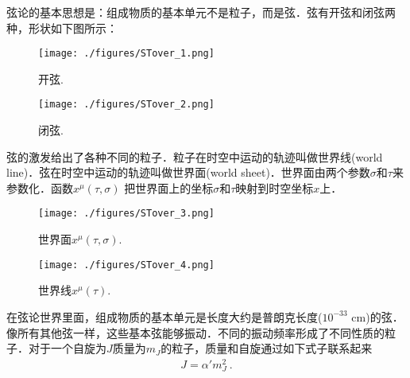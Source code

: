 弦论的基本思想是：组成物质的基本单元不是粒子，而是弦．弦有开弦和闭弦两种，形状如下图所示：
\begin{figure}[ht]
\centering
\texttt{[image: ./figures/STover\_1.png]}
\caption{开弦.} \label{STover_fig1}
\end{figure}
\begin{figure}[ht]
\centering
\texttt{[image: ./figures/STover\_2.png]}
\caption{闭弦.} \label{STover_fig2}
\end{figure}
弦的激发给出了各种不同的粒子．粒子在时空中运动的轨迹叫做世界线(world line)．弦在时空中运动的轨迹叫做世界面(world sheet)．世界面由两个参数$\sigma$和$\tau$来参数化．函数$x^\mu(\tau,\sigma)$ 把世界面上的坐标$\sigma$和$\tau$映射到时空坐标$x$上．

\begin{figure}[ht]
\centering
\texttt{[image: ./figures/STover\_3.png]}
\caption{世界面$x^\mu (\tau,\sigma)$.} \label{STover_fig3}
\end{figure}

\begin{figure}[ht]
\centering
\texttt{[image: ./figures/STover\_4.png]}
\caption{世界线$x^\mu(\tau)$.} \label{STover_fig4}
\end{figure}

在弦论世界里面，组成物质的基本单元是长度大约是普朗克长度($10^{-33}$ cm)的弦．像所有其他弦一样，这些基本弦能够振动．不同的振动频率形成了不同性质的粒子．对于一个自旋为$J$质量为$m_J$的粒子，质量和自旋通过如下式子联系起来
\begin{align}
J = \alpha' m_J^2~.
\end{align}

